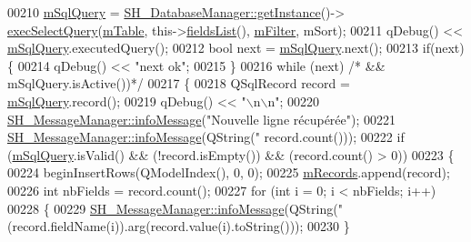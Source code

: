 \begin{DoxyCode}
00210             \hyperlink{classSH__SqlDataModel_a54f0cf057e3200f6b199508958e43fec}{mSqlQuery} = \hyperlink{classSH__DatabaseManager_a638369a15265ab0aa053080a32d2ca39}{SH\_DatabaseManager::getInstance}()->
      \hyperlink{classSH__DatabaseManager_ab8f9850cb68444ab9a4e613b36a3b044}{execSelectQuery}(\hyperlink{classSH__SqlDataModel_a88b8738a0d2803c94295c90c83d65f32}{mTable}, this->\hyperlink{classSH__SqlDataModel_aaca5b8197cf2e6a10cdda5e19522ffec}{fieldsList}(), 
      \hyperlink{classSH__SqlDataModel_af83c15ae3ad1dc4617dd58f2a852a1e2}{mFilter}, mSort);
00211             qDebug() << \hyperlink{classSH__SqlDataModel_a54f0cf057e3200f6b199508958e43fec}{mSqlQuery}.executedQuery();
00212             \textcolor{keywordtype}{bool} next = \hyperlink{classSH__SqlDataModel_a54f0cf057e3200f6b199508958e43fec}{mSqlQuery}.next();
00213             \textcolor{keywordflow}{if}(next) \{
00214                 qDebug() << \textcolor{stringliteral}{"next ok"};
00215             \}
00216             \textcolor{keywordflow}{while} (next) \textcolor{comment}{/* && mSqlQuery.isActive())*/}
00217             \{
00218                 QSqlRecord record = \hyperlink{classSH__SqlDataModel_a54f0cf057e3200f6b199508958e43fec}{mSqlQuery}.record();
00219                 qDebug() << \textcolor{stringliteral}{"\(\backslash\)n\(\backslash\)n"};
00220                 \hyperlink{classSH__MessageManager_a5d9271c143593ccfddce6162b84f8207}{SH\_MessageManager::infoMessage}(\textcolor{stringliteral}{"Nouvelle ligne récupérée"});
00221                 \hyperlink{classSH__MessageManager_a5d9271c143593ccfddce6162b84f8207}{SH\_MessageManager::infoMessage}(QString(\textcolor{stringliteral}{"%
      record.count()));
00222                 \textcolor{keywordflow}{if} (\hyperlink{classSH__SqlDataModel_a54f0cf057e3200f6b199508958e43fec}{mSqlQuery}.isValid() && (!record.isEmpty()) && (record.count() > 0))
00223                 \{
00224                     beginInsertRows(QModelIndex(), 0, 0);
00225                     \hyperlink{classSH__SqlDataModel_aa58096989daac3cd3fdea5e6dd4f27ee}{mRecords}.append(record);
00226                     \textcolor{keywordtype}{int} nbFields = record.count();
00227                     \textcolor{keywordflow}{for} (\textcolor{keywordtype}{int} i = 0; i < nbFields; i++)
00228                     \{
00229                         \hyperlink{classSH__MessageManager_a5d9271c143593ccfddce6162b84f8207}{SH\_MessageManager::infoMessage}(QString(\textcolor{stringliteral}{"%
      (record.fieldName(i)).arg(record.value(i).toString()));
00230                     \}
}}
\end{DoxyCode}
